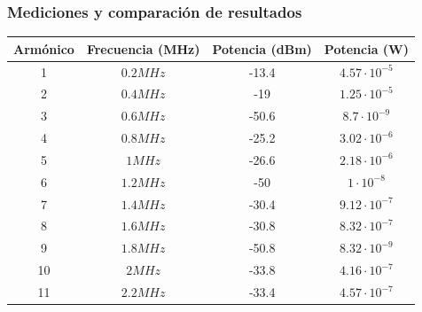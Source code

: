 \documentclass[../../labo_tp5_main.tex]{subfiles}
\begin{document}
\subsubsection{Mediciones y comparación de resultados}
\begin{table}[H] %
	\centering
 		\begin{tabular}{||c c c c||} 
 			\hline
			Armónico & Frecuencia (MHz) & Potencia (dBm) & Potencia (W)\\ [0.5ex] 
 			\hline\hline
			1 & $0.2MHz$ & -13.4 & $4.57\cdot 10^{-5}$\\
			2 & $0.4MHz$ & -19 & $1.25\cdot 10^{-5}$\\
			3 & $0.6MHz$ & -50.6 & $8.7\cdot 10^{-9}$\\
			4 & $0.8MHz$ & -25.2 & $3.02\cdot 10^{-6}$\\
			5 & $1MHz$ & -26.6 & $2.18\cdot 10^{-6}$\\
			6 & $1.2MHz$ & -50 & $1\cdot 10^{-8}$\\
			7 & $1.4MHz$ & -30.4 & $9.12\cdot 10^{-7}$\\
			8 & $1.6MHz$ & -30.8 & $8.32\cdot 10^{-7}$\\
			9 & $1.8MHz$ & -50.8 & $8.32\cdot 10^{-9}$\\
			10 & $2MHz$ & -33.8 & $4.16\cdot 10^{-7}$\\
			11 & $2.2MHz$ & -33.4 & $4.57\cdot 10^{-7}$\\[1ex] 
			\hline
		\end{tabular}
\end{table}
\end{document}
